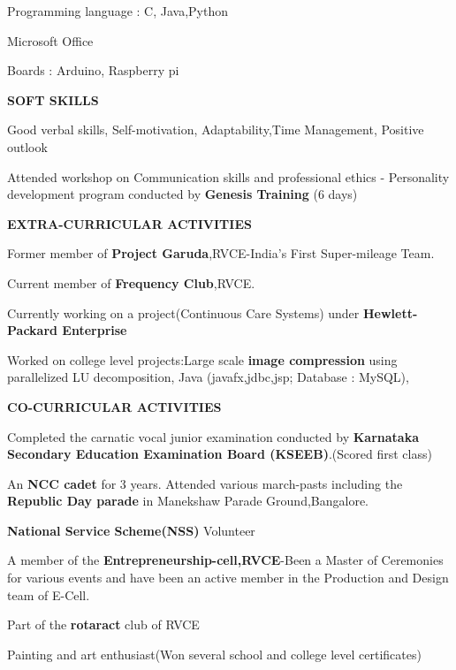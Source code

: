 \documentclass[letterpaper,11pt,oneside]{article}
\begin{document}
\begin{enumerate}
	\small {\item Programming language : C, Java,Python
		\item Microsoft Office
		\item Boards :  Arduino, Raspberry pi
	}
\end{enumerate}

\vspace{2ex}
\noindent\textbf{{\normalsize SOFT SKILLS}} 

\begin{enumerate}
	\small {\item Good verbal skills, Self-motivation, Adaptability,Time Management, Positive outlook
		\item Attended workshop on Communication skills and professional ethics - Personality development program conducted by \textbf{Genesis Training} (6 days)
	}
\end{enumerate}

\vspace{2ex}
\noindent\textbf{{\normalsize  EXTRA-CURRICULAR ACTIVITIES}} 

\begin{itemize}
	\small {\item Former member of \textbf{Project Garuda},RVCE-India's First Super-mileage Team.
		\item Current member of \textbf{Frequency Club},RVCE.
		\item Currently working on a project(Continuous Care Systems) under \textbf{Hewlett-Packard Enterprise}
		\item Worked on college level projects:Large scale \textbf{image compression} using parallelized LU decomposition, Java (javafx,jdbc,jsp; Database : MySQL),\\}
\end{itemize}

\noindent\textbf{{\normalsize  CO-CURRICULAR ACTIVITIES}} 

\begin{enumerate}
	\small {\item Completed the carnatic vocal junior examination conducted by \textbf{Karnataka Secondary Education Examination Board (KSEEB)}.(Scored first class)
		\item An \textbf{NCC cadet} for 3 years. Attended various march-pasts including the \textbf{Republic Day parade} in Manekshaw Parade Ground,Bangalore.
		\item 	\textbf{National Service Scheme(NSS)} Volunteer
		\item	A member of the \textbf{Entrepreneurship-cell,RVCE}-Been a Master of Ceremonies for various events and have been an active member in the Production and Design team of E-Cell.
		\item Part of the \textbf{rotaract} club of RVCE 
		\item  Painting and art enthusiast(Won several school and college level certificates)
	}
\end{enumerate}
\end{document}
